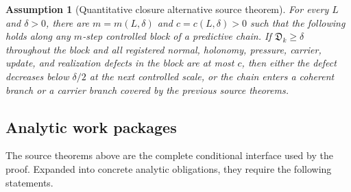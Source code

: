 \documentclass[11pt]{article}
\newtheorem{assumption}[theorem]{Assumption}
\begin{document}
\begin{assumption}[Quantitative closure alternative source theorem]
For every \(L\) and \(\delta>0\), there are \(m=m(L,\delta)\) and
\(c=c(L,\delta)>0\) such that the following holds along any \(m\)-step controlled
block of a predictive chain.  If \(\mathfrak D_k\ge\delta\) throughout the block
and all registered normal, holonomy, pressure, carrier, update, and realization
defects in the block are at most \(c\), then either the defect decreases below
\(\delta/2\) at the next controlled scale, or the chain enters a coherent branch
or a carrier branch covered by the previous source theorems.
\end{assumption}

\subsection{Analytic work packages}

The source theorems above are the complete conditional interface used by the
proof.  Expanded into concrete analytic obligations, they require the following
statements.
\end{document}
